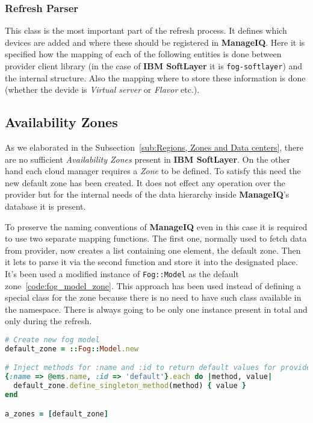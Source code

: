 \subsubsection{Refresh Parser}
\label{subs:Refresh Parser}

This class is the most important part of the refresh process. It defines which devices are added and where these should be registered in \textbf{ManageIQ}. Here it is specified how the mapping of each of the following entities is done between provider client library (in the case of \textbf{IBM SoftLayer} it is \texttt{fog-softlayer}) and the internal structure. Also the mapping where to store these information is done (whether the devide is \emph{Virtual server} or \emph{Flavor} etc.).

\subsection{Availability Zones}
\label{sub:Availability Zones}

As we elaborated in the Subsection~\ref{sub:Regions, Zones and Data centers}, there are no sufficient \emph{Availability Zones} present in \textbf{IBM SoftLayer}. On the other hand each cloud manager requires a \emph{Zone} to be defined. To satisfy this need the new default zone has been created. It does not effect any operation over the provider but for the internal needs of the data hierarchy inside \textbf{ManageIQ}'s database it is present.

To preserve the naming conventions of \textbf{ManageIQ} even in this case it is required to use two separate mapping functions. The first one, normally used to fetch data from provider, now creates a list containing one element, the default zone. Then it lets to parse it via the second function and store it into the designated place. It's been used a modified instance of \texttt{Fog::Model} as the default zone~\ref{code:fog_model_zone}. This approach has been used instead of defining a special class for the zone because there is no need to have such class available in the namespace. There is always going to be only one instance present in total and only during the refresh.

\begin{lstlisting}[language=Ruby,caption={Declaration of the default \emph{Availability Zone}},label=code:fog_model_zone,float=htpb]
# Create new fog model
default_zone = ::Fog::Model.new

# Inject methods for :name and :id to return default values for provider
{:name => @ems.name, :id => 'default'}.each do |method, value|
  default_zone.define_singleton_method(method) { value }
end

a_zones = [default_zone]
\end{lstlisting}

